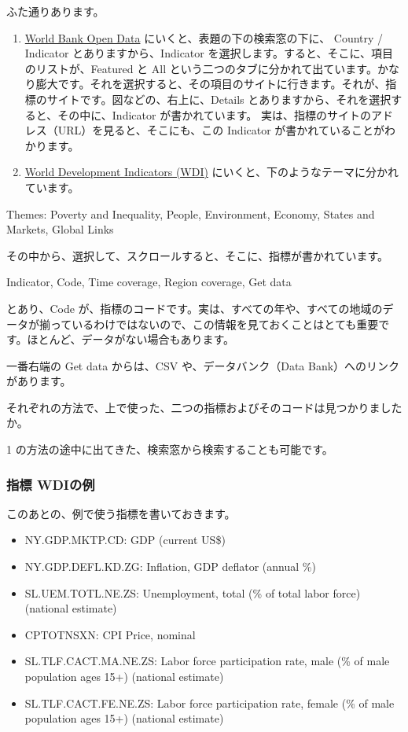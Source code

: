 \documentclass[
]{bxjsbook}
\providecommand{\tightlist}{%
  \setlength{\itemsep}{0pt}\setlength{\parskip}{0pt}}
\theoremstyle{definition}
\theoremstyle{definition}
\theoremstyle{definition}
\theoremstyle{definition}
\theoremstyle{remark}
\begin{document}
ふた通りあります。

\begin{enumerate}
\def\labelenumi{\arabic{enumi}.}
\item
  \href{https://data.worldbank.org}{World Bank Open Data} にいくと、表題の下の検索窓の下に、 Country / Indicator とありますから、Indicator を選択します。すると、そこに、項目のリストが、Featured と All という二つのタブに分かれて出ています。かなり膨大です。それを選択すると、その項目のサイトに行きます。それが、指標のサイトです。図などの、右上に、Details とありますから、それを選択すると、その中に、Indicator が書かれています。
  実は、指標のサイトのアドレス（URL）を見ると、そこにも、この Indicator が書かれていることがわかります。
\item
  \href{https://datatopics.worldbank.org/world-development-indicators/}{World Development Indicators (WDI)} にいくと、下のようなテーマに分かれています。
\end{enumerate}

Themes: Poverty and Inequality, People, Environment, Economy, States and Markets, Global Links

その中から、選択して、スクロールすると、そこに、指標が書かれています。

Indicator, Code, Time coverage, Region coverage, Get data

とあり、Code が、指標のコードです。実は、すべての年や、すべての地域のデータが揃っているわけではないので、この情報を見ておくことはとても重要です。ほとんど、データがない場合もあります。

一番右端の Get data からは、CSV や、データバンク（Data Bank）へのリンクがあります。

それぞれの方法で、上で使った、二つの指標およびそのコードは見つかりましたか。

1 の方法の途中に出てきた、検索窓から検索することも可能です。

\hypertarget{ux6307ux6a19-wdiux306eux4f8b}{%
\subsubsection{指標 WDIの例}\label{ux6307ux6a19-wdiux306eux4f8b}}

このあとの、例で使う指標を書いておきます。

\begin{itemize}
\tightlist
\item
  NY.GDP.MKTP.CD: GDP (current US\$)
\item
  NY.GDP.DEFL.KD.ZG: Inflation, GDP deflator (annual \%)
\item
  SL.UEM.TOTL.NE.ZS: Unemployment, total (\% of total labor force) (national estimate)
\item
  CPTOTNSXN: CPI Price, nominal
\item
  SL.TLF.CACT.MA.NE.ZS: Labor force participation rate, male (\% of male population ages 15+) (national estimate)
\item
  SL.TLF.CACT.FE.NE.ZS: Labor force participation rate, female (\% of male population ages 15+) (national estimate)
\end{itemize}
\end{document}
